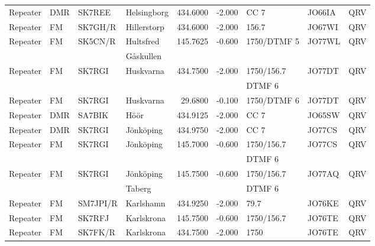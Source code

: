 \begin{longtable}{llllrrlll}
Repeater & DMR             & SK7REE   & Helsingborg  & 434.6000     & -2.000     & CC 7         & JO66IA      & QRV      \\
Repeater & FM              & SK7GH/R  & Hillerstorp  & 434.6000     & -2.000     & 156.7        & JO67WI      & QRV      \\
Repeater & FM              & SK5CN/R  & Hultsfred    & 145.7625     & -0.600     & 1750/DTMF 5  & JO77WL      & QRV      \\
         &                 &          & Gåskullen    &              &            &              &             &          \\
Repeater & FM              & SK7RGI   & Huskvarna    & 434.7500     & -2.000     & 1750/156.7   & JO77DT      & QRV      \\
         &                 &          &              &              &            & DTMF 6       &             &          \\
Repeater & FM              & SK7RGI   & Huskvarna    & 29.6800      & -0.100     & 1750/DTMF 6  & JO77DT      & QRV      \\
Repeater & DMR             & SA7BIK   & Höör         & 434.9125     & -2.000     & CC 7         & JO65SW      & QRV      \\
Repeater & DMR             & SK7RGI   & Jönköping    & 434.9750     & -2.000     & CC 7         & JO77CS      & QRV      \\
Repeater & FM              & SK7RGI   & Jönköping    & 145.7000     & -0.600     & 1750/156.7   & JO77CS      & QRV      \\
         &                 &          &              &              &            & DTMF 6       &             &          \\
Repeater & FM              & SK7RGI   & Jönköping    & 145.7500     & -0.600     & 1750/156.7   & JO77AQ      & QRV      \\
         &                 &          & Taberg       &              &            & DTMF 6       &             &          \\
Repeater & FM              & SM7JPI/R & Karlshamn    & 434.9250     & -2.000     & 79.7         & JO76KE      & QRV      \\
Repeater & FM              & SK7RFJ   & Karlskrona   & 145.7500     & -0.600     & 1750/156.7   & JO76TE      & QRV      \\
Repeater & FM              & SK7FK/R  & Karlskrona   & 434.7500     & -2.000     & 1750         & JO76TE      & QRV      \\

\end{longtable}
